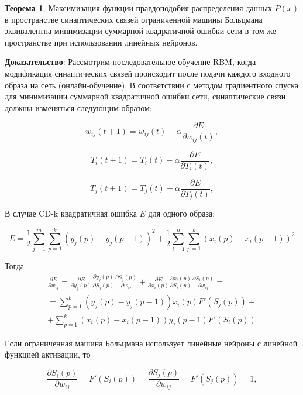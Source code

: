 \textbf{Теорема 1}. Максимизация функции правдоподобия распределения данных $P(x)$ в пространстве синаптических связей ограниченной машины Больцмана эквивалентна минимизации суммарной квадратичной ошибки сети в том же пространстве при использовании линейных нейронов.

\textbf{Доказательство}: Рассмотрим последовательное обучение RBM, когда модификация синаптических связей происходит после подачи каждого входного образа на сеть (онлайн-обучение). В соответствии с методом градиентного спуска для минимизации суммарной квадратичной ошибки сети, синаптические связи должны изменяться следующим образом:	

\begin{equation}
w_{ij}(t+1)=w_{ij}(t)-\alpha\frac{\partial E}{\partial w_{ij}(t)},
\end{equation}		

\begin{equation}
T_{i}(t+1)=T_{i}(t)-\alpha\frac{\partial E}{\partial T_{i}(t)},
\end{equation}		

\begin{equation}
T_{j}(t+1)=T_{j}(t)-\alpha\frac{\partial E}{\partial T_{j}(t)},
\end{equation}

В случае CD-k квадратичная ошибка $E$ для одного образа:

\begin{equation*}
E=\frac{1}{2}\sum_{j=1}^m\sum_{p=1}^k (y_j(p)-y_j(p-1))^2+\frac{1}{2}\sum_{i=1}^n\sum_{p=1}^k (x_i(p)-x_i(p-1))^2
\end{equation*}

Тогда
\begin{multline*}
    \frac{\partial E}{\partial w_{ij}}=\frac{\partial E}{\partial y_j(p)}\frac{\partial y_j(p)}{\partial S_j(p)}\frac{\partial S_j(p)}{\partial w_{ij}}+\frac{\partial E}{\partial x_i(p)}\frac{\partial x_i(p)}{\partial S_i(p)}\frac{\partial S_i(p)}{\partial w_{ij}}=\\=\sum_{p=1}^k (y_j(p)-y_j(p-1))x_i(p)F'(S_j(p))+\\+\sum_{p=1}^k (x_i(p)-x_i(p-1))y_j(p-1)F'(S_i(p))
\end{multline*}

Если ограниченная машина Больцмана использует линейные нейроны с линейной функцией активации, то

\begin{equation*}
    \frac{\partial S_i(p)}{\partial w_{ij}}=F'(S_i(p))=\frac{\partial S_j(p)}{\partial w_{ij}}=F'(S_j(p))=1,
\end{equation*}

